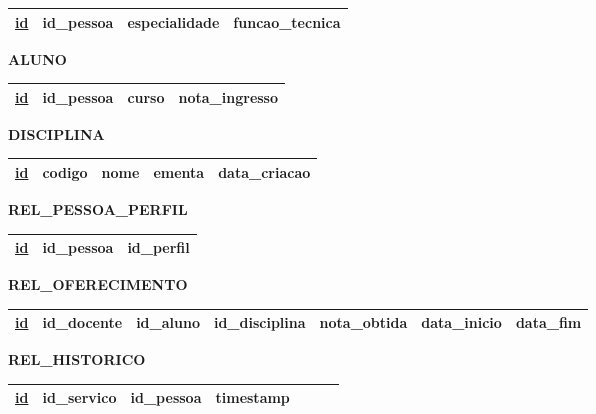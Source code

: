 \documentclass{article}
\begin{document}
\begin{table}[H]
  \renewcommand{\arraystretch}{1.5}
  \begin{tabular}{|c|c|c|c|}
    \hline
    \underline{id} &
    id\_pessoa &
    especialidade &
    funcao\_tecnica \\
    \hline
  \end{tabular}
\end{table}

\noindent
\textbf{ALUNO}
\vspace{-5pt}

\begin{table}[H]
  \renewcommand{\arraystretch}{1.5}
  \begin{tabular}{|c|c|c|c|}
    \hline
    \underline{id} &
    id\_pessoa &
    curso &
    nota\_ingresso \\
    \hline
  \end{tabular}
\end{table}

\noindent
\textbf{DISCIPLINA}
\vspace{-5pt}

\begin{table}[H]
  \renewcommand{\arraystretch}{1.5}
  \begin{tabular}{|c|c|c|c|c|}
    \hline
    \underline{id} &
    codigo &
    nome &
    ementa &
    data\_criacao \\
    \hline
  \end{tabular}
\end{table}

\noindent
\textbf{REL\_PESSOA\_PERFIL}
\vspace{-5pt}

\begin{table}[H]
  \renewcommand{\arraystretch}{1.5}
  \begin{tabular}{|c|c|c|}
    \hline
    \underline{id} &
    id\_pessoa &
    id\_perfil \\
    \hline
  \end{tabular}
\end{table}

\noindent
\textbf{REL\_OFERECIMENTO}
\vspace{-5pt}

\begin{table}[H]
  \renewcommand{\arraystretch}{1.5}
  \begin{tabular}{|c|c|c|c|c|c|c|}
    \hline
    \underline{id} &
    id\_docente &
    id\_aluno &
    id\_disciplina &
    nota\_obtida &
    data\_inicio &
    data\_fim \\
    \hline
  \end{tabular}
\end{table}

\noindent
\textbf{REL\_HISTORICO}
\vspace{-5pt}

\begin{table}[H]
  \renewcommand{\arraystretch}{1.5}
  \begin{tabular}{|c|c|c|c|c|c|c|}
    \hline
    \underline{id} &
    id\_servico &
    id\_pessoa &
    timestamp \\
    \hline
  \end{tabular}
\end{table}
\end{document}
